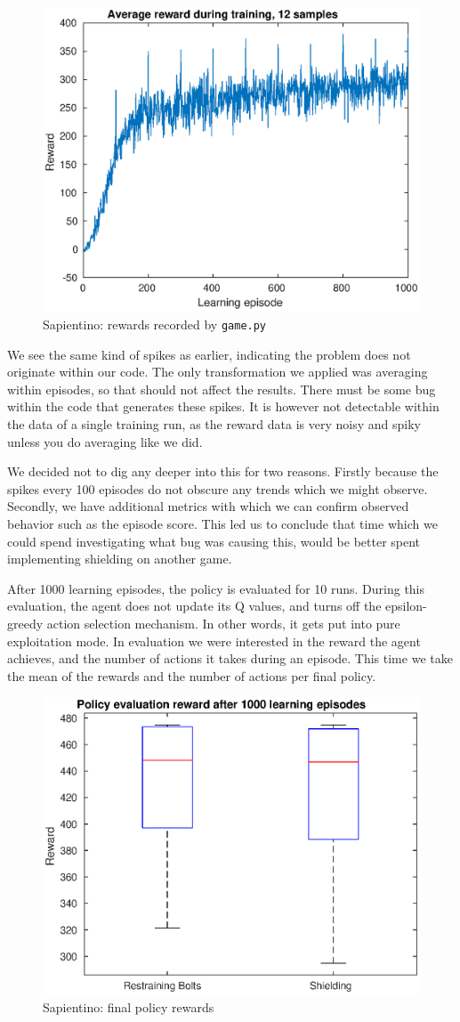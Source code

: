 \documentclass[letterpaper]{article}
\begin{document}
\begin{figure}[h]
    \centering
    \includegraphics[width=.5\textwidth]{figs/sapientino_reward_game_py.eps}
    \caption{Sapientino: rewards recorded by \texttt{game.py}}
    \label{fig:sapientino_game_py}
\end{figure}
\par We see the same kind of spikes as earlier, indicating the problem does not originate within our code. The only transformation we applied was averaging within episodes, so that should not affect the results. There must be some bug within the code that generates these spikes. It is however not detectable within the data of a single training run, as the reward data is very noisy and spiky unless you do averaging like we did.
\par We decided not to dig any deeper into this for two reasons. Firstly because the spikes every 100 episodes do not obscure any trends which we might observe. Secondly, we have additional metrics with which we can confirm observed behavior such as the episode score. This led us to conclude that time which we could spend investigating what bug was causing this, would be better spent implementing shielding on another game.
\par After 1000 learning episodes, the policy is evaluated for 10 runs. During this evaluation, the agent does not update its Q values, and turns off the epsilon-greedy action selection mechanism. In other words, it gets put into pure exploitation mode. In evaluation we were interested in the reward the agent achieves, and the number of actions it takes during an episode. This time we take the mean of the rewards and the number of actions per final policy. 
\begin{figure}
    \centering
    \includegraphics[width=.5\textwidth]{figs/policy_reward.eps}
    \caption{Sapientino: final policy rewards}
    \label{fig:sapientino_policy_reward}
\end{figure}
\end{document}
